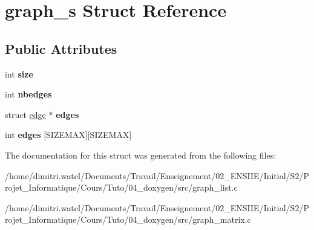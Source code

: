 \hypertarget{structgraph__s}{}\section{graph\+\_\+s Struct Reference}
\label{structgraph__s}
\subsection*{Public Attributes}
\begin{DoxyCompactItemize}
\item 
\mbox{\label{structgraph__s_af392b934667f1a84900a28ad5e653f6d}} 
int {\bfseries size}
\item 
\mbox{\label{structgraph__s_ab79bc0fcf50979e538d2394a9adc5252}} 
int {\bfseries nbedges}
\item 
\mbox{\label{structgraph__s_a982a00ee913105276b0d0f4677b14bcc}} 
struct \hyperlink{structedge}{edge} $\ast$ {\bfseries edges}
\item 
\mbox{\label{structgraph__s_a27c2ad0e625b13788b1d1b08591c9518}} 
int {\bfseries edges} \mbox{[}S\+I\+Z\+E\+M\+AX\mbox{]}\mbox{[}S\+I\+Z\+E\+M\+AX\mbox{]}
\end{DoxyCompactItemize}


The documentation for this struct was generated from the following files\+:\begin{DoxyCompactItemize}
\item 
/home/dimitri.\+watel/\+Documents/\+Travail/\+Enseignement/02\+\_\+\+E\+N\+S\+I\+I\+E/\+Initial/\+S2/\+Projet\+\_\+\+Informatique/\+Cours/\+Tuto/04\+\_\+doxygen/src/graph\+\_\+list.\+c\item 
/home/dimitri.\+watel/\+Documents/\+Travail/\+Enseignement/02\+\_\+\+E\+N\+S\+I\+I\+E/\+Initial/\+S2/\+Projet\+\_\+\+Informatique/\+Cours/\+Tuto/04\+\_\+doxygen/src/graph\+\_\+matrix.\+c\end{DoxyCompactItemize}
